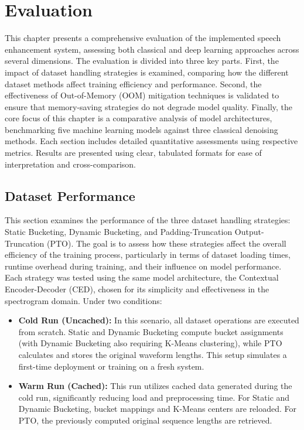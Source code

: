 \graphicspath{{content/chapters/7_evaluation/figures/}}
\chapter{Evaluation}
\label{chp:evaluation}

This chapter presents a comprehensive evaluation of the implemented speech enhancement system, assessing both classical and deep learning approaches across several dimensions. The evaluation is divided into three key parts. First, the impact of dataset handling strategies is examined, comparing how the different dataset methods affect training efficiency and performance. Second, the effectiveness of Out-of-Memory (OOM) mitigation techniques is validated to ensure that memory-saving strategies do not degrade model quality. Finally, the core focus of this chapter is a comparative analysis of model architectures, benchmarking five machine learning models against three classical denoising methods. Each section includes detailed quantitative assessments using respective metrics. Results are presented using clear, tabulated formats for ease of interpretation and cross-comparison.

\section{Dataset Performance}
\label{sec:dataset_performance}

This section examines the performance of the three dataset handling strategies: Static Bucketing, Dynamic Bucketing, and Padding-Truncation Output-Truncation (PTO). The goal is to assess how these strategies affect the overall efficiency of the training process, particularly in terms of dataset loading times, runtime overhead during training, and their influence on model performance. Each strategy was tested using the same model architecture, the Contextual Encoder-Decoder (CED), chosen for its simplicity and effectiveness in the spectrogram domain. Under two conditions:

\begin{itemize}
    \item \textbf{Cold Run (Uncached):} In this scenario, all dataset operations are executed from scratch. Static and Dynamic Bucketing compute bucket assignments (with Dynamic Bucketing also requiring K-Means clustering), while PTO calculates and stores the original waveform lengths. This setup simulates a first-time deployment or training on a fresh system.
    
    \item \textbf{Warm Run (Cached):} This run utilizes cached data generated during the cold run, significantly reducing load and preprocessing time. For Static and Dynamic Bucketing, bucket mappings and K-Means centers are reloaded. For PTO, the previously computed original sequence lengths are retrieved.
\end{itemize}

